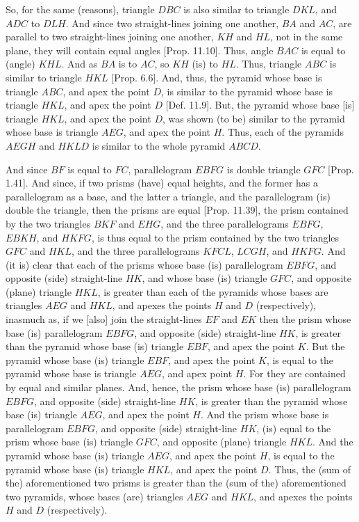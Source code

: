 \begin{Parallel}{}{}
{So, for the same (reasons), triangle $DBC$ is also similar to triangle $DKL$, and
$ADC$ to $DLH$. And since two straight-lines joining one another, $BA$ and $AC$, are parallel
to two straight-lines joining one another, $KH$ and $HL$, not in the same plane, they will
contain equal angles [Prop. 11.10]. Thus, angle $BAC$ is equal
to (angle) $KHL$. And as $BA$ is to $AC$, so $KH$ (is) to $HL$. Thus, triangle $ABC$ is
similar to triangle $HKL$ [Prop. 6.6]. And, thus, the pyramid whose base is triangle $ABC$, and apex
the point $D$, is similar to the pyramid whose base is triangle $HKL$, and apex the point $D$ [Def. 11.9]. But,
the pyramid whose base [is] triangle $HKL$, and apex the point $D$, was shown (to be) similar
to the pyramid whose base is triangle $AEG$, and apex the point $H$. Thus, each of the pyramids
$AEGH$ and $HKLD$ is similar to the whole pyramid $ABCD$.

And since $BF$ is equal to $FC$, parallelogram $EBFG$ is double triangle $GFC$ [Prop. 1.41]. And since, if two prisms (have) 
equal heights, and the former has a parallelogram as a base, and the latter a triangle, and the parallelogram (is) double
the triangle, then the prisms are equal [Prop. 11.39],  the prism
contained by the two triangles $BKF$ and $EHG$, and the three parallelograms $EBFG$,
$EBKH$, and $HKFG$, is thus  equal to the prism contained by the two triangles $GFC$ and
$HKL$, and the three parallelograms $KFCL$, $LCGH$, and $HKFG$. And (it is) clear that
each of the prisms whose base (is) parallelogram $EBFG$, and opposite (side) straight-line
$HK$, and whose base (is) triangle $GFC$, and opposite (plane) triangle $HKL$, is greater than
each of the pyramids whose bases are triangles $AEG$ and $HKL$, and apexes the points
$H$ and $D$ (respectively), inasmuch as, if we [also] join the straight-lines
$EF$ and $EK$ then the prism whose base (is) parallelogram $EBFG$, and opposite
(side) straight-line $HK$, is greater than the pyramid whose base (is) triangle $EBF$,
and apex the point $K$. But the pyramid whose base (is) triangle $EBF$, and apex the point $K$,
is equal to the pyramid whose base is triangle $AEG$, and apex point $H$. For
they are contained by equal and similar planes. And, hence, the prism whose base (is)
parallelogram $EBFG$, and opposite (side) straight-line $HK$, is greater than the pyramid
whose base (is) triangle $AEG$, and apex the  point $H$. And the prism 
whose base is
parallelogram $EBFG$, and opposite (side) straight-line $HK$, (is) equal to the prism
whose base (is) triangle $GFC$, and opposite (plane) triangle $HKL$. And the pyramid whose
base (is) triangle $AEG$, and apex the  point $H$, is equal to the pyramid whose base (is) triangle
$HKL$, and apex the point $D$. Thus, the (sum of the) aforementioned
two prisms is greater than the (sum of the) aforementioned two pyramids, whose bases (are)
triangles $AEG$ and $HKL$, and apexes the points $H$ and $D$ (respectively).

}
\end{Parallel}
